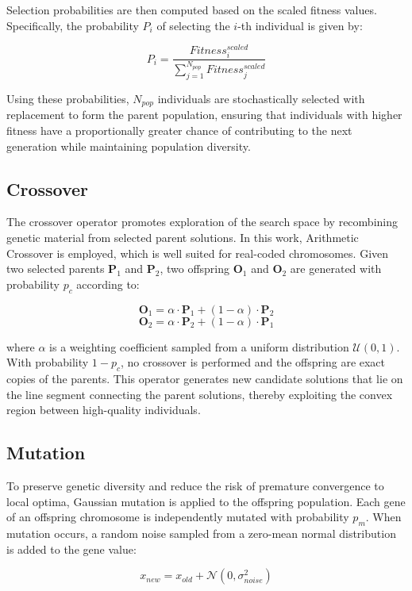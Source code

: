 \documentclass[11pt]{article}
\begin{document}
Selection probabilities are then computed based on the scaled fitness values. Specifically, the probability $P_i$ of selecting the $i$-th individual is given by:

$$
P_i = \frac{Fitness^{scaled}_i}{\sum_{j=1}^{N_{pop}} Fitness^{scaled}_j}
$$

Using these probabilities, $N_{pop}$ individuals are stochastically selected with replacement to form the parent population, ensuring that individuals with higher fitness have a proportionally greater chance of contributing to the next generation while maintaining population diversity.

\subsection{Crossover}

The crossover operator promotes exploration of the search space by recombining genetic material from selected parent solutions. In this work, Arithmetic Crossover is employed, which is well suited for real-coded chromosomes. Given two selected parents $\mathbf{P}_1$ and $\mathbf{P}_2$, two offspring $\mathbf{O}_1$ and $\mathbf{O}_2$ are generated with probability $p_c$ according to:

$$ \mathbf{O}_1 = \alpha \cdot \mathbf{P}_1 + (1-\alpha) \cdot \mathbf{P}_2 $$
$$ \mathbf{O}_2 = \alpha \cdot \mathbf{P}_2 + (1-\alpha) \cdot \mathbf{P}_1 $$

where $\alpha$ is a weighting coefficient sampled from a uniform distribution $\mathcal{U}(0,1)$. With probability $1 - p_c$, no crossover is performed and the offspring are exact copies of the parents. This operator generates new candidate solutions that lie on the line segment connecting the parent solutions, thereby exploiting the convex region between high-quality individuals.

\subsection{Mutation}

To preserve genetic diversity and reduce the risk of premature convergence to local optima, Gaussian mutation is applied to the offspring population. Each gene of an offspring chromosome is independently mutated with probability $p_m$. When mutation occurs, a random noise sampled from a zero-mean normal distribution is added to the gene value:

$$
x_{new} = x_{old} + \mathcal{N}(0, \sigma_{noise}^2)
$$
\end{document}
